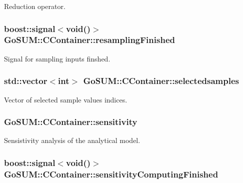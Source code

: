 Reduction operator. 

\hypertarget{class_go_s_u_m_1_1_c_container_a8ffc8d8267d0e21fd4129e9edaaf2e95}{
\subsubsection[{resampling\-Finished}]{\setlength{\rightskip}{0pt plus 5cm}boost\-::signal$<$void()$>$ Go\-S\-U\-M\-::\-C\-Container\-::resampling\-Finished}}\label{class_go_s_u_m_1_1_c_container_a8ffc8d8267d0e21fd4129e9edaaf2e95}


Signal for sampling inputs finshed. 

\hypertarget{class_go_s_u_m_1_1_c_container_a9a189048aeeaecf4aead1b0b62ff0814}{
\subsubsection[{selectedsamples}]{\setlength{\rightskip}{0pt plus 5cm}std\-::vector$<$int$>$ Go\-S\-U\-M\-::\-C\-Container\-::selectedsamples\hspace{0.3cm}{\ttfamily [private]}}}\label{class_go_s_u_m_1_1_c_container_a9a189048aeeaecf4aead1b0b62ff0814}
Vector of selected sample values indices. \hypertarget{class_go_s_u_m_1_1_c_container_a8c0bf21d8d7f30490a79e63ac9a342e1}{
\subsubsection[{sensitivity}]{ Go\-S\-U\-M\-::\-C\-Container\-::sensitivity\hspace{0.3cm}{\ttfamily [private]}}}\label{class_go_s_u_m_1_1_c_container_a8c0bf21d8d7f30490a79e63ac9a342e1}


Sensistivity analysis of the analytical model. 

\hypertarget{class_go_s_u_m_1_1_c_container_a5d2ebab5941a91bb36e6c5bad4764d88}{
\subsubsection[{sensitivity\-Computing\-Finished}]{\setlength{\rightskip}{0pt plus 5cm}boost\-::signal$<$void()$>$ Go\-S\-U\-M\-::\-C\-Container\-::sensitivity\-Computing\-Finished}}\label{class_go_s_u_m_1_1_c_container_a5d2ebab5941a91bb36e6c5bad4764d88}


